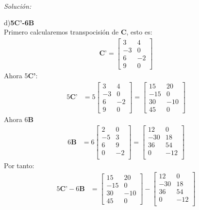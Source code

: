 \documentclass[12pt]{article}
\newenvironment{sol}
    {\emph{Solución:}
    }
    {
    }
\begin{document}
\begin{sol}
d)\textbf{5C'-6B} \\
Primero calcularemos transpocisión de \textbf{C}, esto es:\\
\begin{align*}
\textbf{C'}=
\begin{bmatrix}
	3 & 4 \\
	-3 & 0 \\
	6 & -2 \\
	9 & 0 
\end{bmatrix}
\end{align*}
Ahora 5\textbf{C'}:
\begin{align*}
5\textbf{C'} &= 5
\begin{bmatrix}
	3 & 4 \\
	-3 & 0 \\
	6 & -2 \\
	9 & 0 
\end{bmatrix}
=
\begin{bmatrix}
	15 & 20 \\
	-15 & 0 \\
	30 & -10 \\
	45 & 0 
\end{bmatrix}
\end{align*}
Ahora 6\textbf{B}
\begin{align*}
6\textbf{B} &=6
\begin{bmatrix}
2 & 0 \\
-5 & 3 \\
6 & 9 \\
0 & -2 \\
\end{bmatrix}
=
\begin{bmatrix}
12 & 0 \\
-30 & 18 \\
36 & 54 \\
0 & -12 \\
\end{bmatrix}
\end{align*}
Por tanto:
\begin{align*}
5\textbf{C'}-6\textbf{B} &=
\begin{bmatrix}
	15 & 20 \\
	-15 & 0 \\
	30 & -10 \\
	45 & 0 
\end{bmatrix}
-
\begin{bmatrix}
12 & 0 \\
-30 & 18 \\
36 & 54 \\
0 & -12 \\

\end{bmatrix}
\end{align*}
\end{sol}
\end{document}
